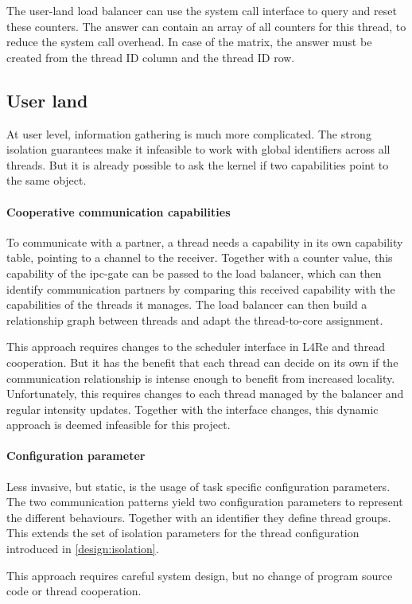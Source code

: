 The user-land load balancer can use the system call interface to query
and reset these counters.
The answer can contain an array of all counters for this thread, to reduce the
system call overhead.
In case of the matrix, the answer must be created from the thread ID column and
the thread ID row.


\subsection{User land}
At user level, information gathering is much more complicated.
The strong isolation guarantees make it infeasible to work with global
identifiers across all threads.
But it is already possible to ask the kernel if two capabilities point to the
same object.

\paragraph{Cooperative communication capabilities}
To communicate with a partner, a thread needs a capability in its own
capability table, pointing to a channel to the receiver.
Together with a counter value, this capability of the \gls{ipc}-gate can be
passed to the load balancer, which can then identify communication partners by
comparing this received capability with the capabilities of the threads
it manages.
The load balancer can then build a relationship graph between threads and adapt
the thread-to-core assignment.

This approach requires changes to the scheduler interface in L4Re and
thread cooperation.
But it has the benefit that each thread can decide on its own if the
communication relationship is intense enough to benefit from increased
locality.
Unfortunately, this requires changes to each thread managed by the balancer and
regular intensity updates.
Together with the interface changes, this dynamic approach is deemed infeasible
for this project.

\paragraph{Configuration parameter}
Less invasive, but static, is the usage of task specific configuration parameters.
The two communication patterns yield two configuration parameters to represent the
different behaviours.
Together with an identifier they define thread groups.
This extends the set of isolation parameters for the thread configuration
introduced in \ref{design:isolation}.

This approach requires careful system design, but no change of program source
code or thread cooperation.
